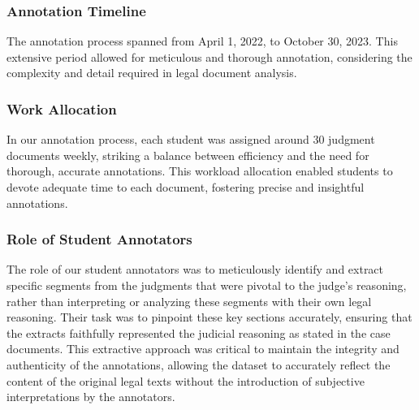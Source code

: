 \subsubsection{Annotation Timeline} The annotation process spanned from April 1, 2022, to October 30, 2023. This extensive period allowed for meticulous and thorough annotation, considering the complexity and detail required in legal document analysis.

\subsubsection{Work Allocation}
In our annotation process, each student was assigned around 30 judgment documents weekly, striking a balance between efficiency and the need for thorough, accurate annotations. This workload allocation enabled students to devote adequate time to each document, fostering precise and insightful annotations. 
\subsubsection{Role of Student Annotators}
The role of our student annotators was to meticulously identify and extract specific segments from the judgments that were pivotal to the judge's reasoning, rather than interpreting or analyzing these segments with their own legal reasoning. Their task was to pinpoint these key sections accurately, ensuring that the extracts faithfully represented the judicial reasoning as stated in the case documents. This extractive approach was critical to maintain the integrity and authenticity of the annotations, allowing the dataset to accurately reflect the content of the original legal texts without the introduction of subjective interpretations by the annotators.

% 
